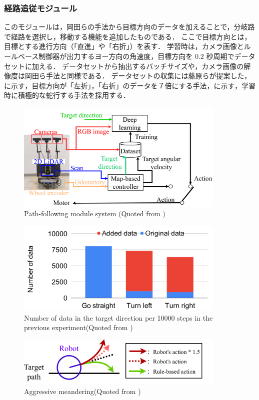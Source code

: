 \subsubsection{経路追従モジュール}
このモジュールは，岡田らの手法から目標方向のデータを加えることで，分岐路で経路を選択し，移動する機能を追加したものである．
ここで目標方向とは，目標とする進行方向（「直進」や「右折」）を表す．
学習時は，カメラ画像とルールベース制御器が出力するヨー方向の角速度，目標方向を 0.2 秒周期でデータセットに加える．
データセットから抽出するバッチサイズや，カメラ画像の解像度は岡田ら手法と同様である．
データセットの収集には藤原ら\cite{fujiwara2023}が提案した，に示す，目標方向が「左折」，「右折」のデータを７倍にする手法，に示す，学習時に積極的な蛇行する手法を採用する．

\begin{figure}[htbp]
  \centering
  \includegraphics[width=100mm]{images/pdf/haruyama/pathfollow_sys.pdf}
  \caption{Path-following module system (Quoted from \cite{haruyama2023})}
  \label{fig:pathfollow}
\end{figure}

\begin{figure}[htbp]
  \centering
  \includegraphics[width=100mm]{images/pdf/fujiwara/oversample.pdf}
  \caption{Number of data in the target direction per 10000 steps in the previous 
  experiment(Quoted from \cite{fujiwara2023})}
  \label{fig:oversample}
\end{figure}

\begin{figure}[htbp]
  \centering
  \includegraphics[width=100mm]{images/pdf/fujiwara/behavior.pdf}
  \caption{Aggressive meandering(Quoted from \cite{fujiwara2023})}
  \label{fig:behavior}
\end{figure}

